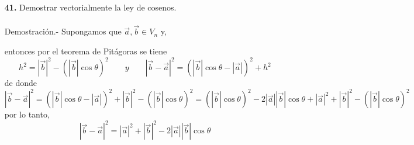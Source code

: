 \begin{enumerate}
\item [\Large\bfseries 41.] Demostrar vectorialmente la ley de cosenos.\\\\
    Demostración.-\; Supongamos que $\vec{a},\vec{b} \in V_n$ y, 
    \begin{center}
    \end{center}
    entonces por el teorema de Pitágoras se tiene $$h^2=|\vec{b}|^2 - \left(|\vec{b}|\cos \theta\right)^2 \qquad y \qquad |\vec{b}-\vec{a}|^2 = \left(|\vec{b}|\cos \theta - |\vec{a}|\right)^2+h^2$$
    de donde $$|\vec{b}-\vec{a}|^2 = \left(|\vec{b}|\cos \theta - |\vec{a}|\right)^2+|\vec{b}|^2 - \left(|\vec{b}|\cos \theta\right)^2 = \left(|\vec{b}|\cos \theta\right)^2 - 2|\vec{a}||\vec{b}|\cos \theta + |\vec{a}|^2 + |\vec{b}|^2 - \left(|\vec{b}|\cos \theta\right)^2$$
    por lo tanto, $$|\vec{b}-\vec{a}|^2 = |\vec{a}|^2 + |\vec{b}|^2 - 2|\vec{a}||\vec{b}|\cos \theta $$\\


    


\end{enumerate}


